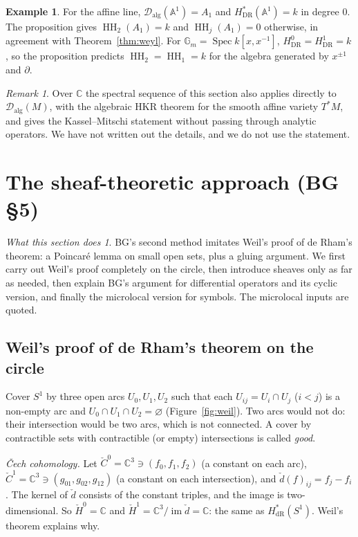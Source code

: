 \documentclass[11pt,oneside,reqno]{article}
\DeclareMathOperator{\HH}{HH}
\DeclareMathOperator{\Ran}{im}
\newcommand{\C}{\mathbb C}
\newcommand{\cD}{\mathcal D}
\newcommand{\pa}{\partial}
\theoremstyle{plain}
\theoremstyle{definition}
\newtheorem{example}[theorem]{Example}
\theoremstyle{remark}
\newtheorem{remark}[theorem]{Remark}
\newtheorem*{whatdoes}{What this section does}
\begin{document}
\begin{example}
For the affine line, \(\cD_{\mathrm{alg}}(\mathbb A^1)=A_1\) and \(H^*_{\mathrm{DR}}(\mathbb A^1)=k\) in degree \(0\).
The proposition gives \(\HH_2(A_1)=k\) and \(\HH_j(A_1)=0\) otherwise, in agreement with
Theorem~\ref{thm:weyl}. For \(\mathbb G_m=\operatorname{Spec}k[x,x^{-1}]\), \(H^0_{\mathrm{DR}}=H^1_{\mathrm{DR}}=k\), so the
proposition predicts \(\HH_2=\HH_1=k\) for the algebra generated by \(x^{\pm1}\) and \(\pa\).
\end{example}

\begin{remark}
Over \(\C\) the spectral sequence of this section also applies directly to
\(\cD_{\mathrm{alg}}(M)\), with the algebraic HKR theorem for the smooth affine variety
\(T^*M\), and gives the Kassel--Mitschi statement without passing through analytic
operators. We have not written out the details, and we do not use the
statement.
\end{remark}

\section{The sheaf-theoretic approach (BG \S5)}\label{sec:sheaf}

\begin{whatdoes}
BG's second method imitates Weil's proof of de Rham's theorem: a Poincaré lemma on
small open sets, plus a gluing argument. We first carry out Weil's proof completely
on the circle, then introduce sheaves only as far as needed, then explain BG's
argument for differential operators and its cyclic version, and finally the
microlocal version for symbols. The microlocal inputs are quoted.
\end{whatdoes}

\subsection{Weil's proof of de Rham's theorem on the circle}\label{subsec:weilS1}
Cover \(S^1\) by three open arcs \(U_0,U_1,U_2\) such that each \(U_{ij}=U_i\cap U_j\) (\(i<j\)) is a
non-empty arc and \(U_0\cap U_1\cap U_2=\varnothing\) (Figure~\ref{fig:weil}). Two arcs would not do:
their intersection would be two arcs, which is not connected. A cover by
contractible sets with contractible (or empty) intersections is called \emph{good}.

\emph{Čech cohomology.} Let \(\check C^0=\C^3\ni(f_0,f_1,f_2)\) (a constant on each arc),
\(\check C^1=\C^3\ni(g_{01},g_{02},g_{12})\) (a constant on each intersection), and
\(\check d(f)_{ij}=f_j-f_i\). The kernel of \(\check d\) consists of the constant triples, and the image is
two-dimensional. So \(\check H^0=\C\) and \(\check H^1=\C^3/\Ran\check d=\C\): the same as \(H^*_{\mathrm{dR}}(S^1)\). Weil's
theorem explains why.
\end{document}
